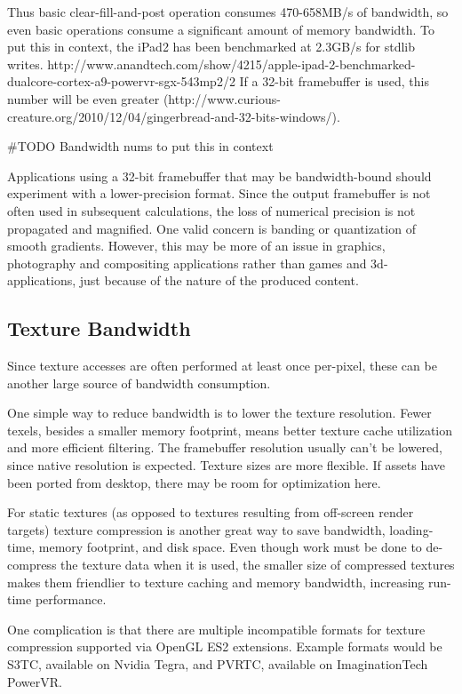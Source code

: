 Thus basic clear-fill-and-post operation consumes 470-658MB/s of bandwidth, so even basic operations consume a significant amount of memory bandwidth.  To put this in context, the iPad2 has been benchmarked at 2.3GB/s for stdlib writes.  http://www.anandtech.com/show/4215/apple-ipad-2-benchmarked-dualcore-cortex-a9-powervr-sgx-543mp2/2
If a 32-bit framebuffer is used, this number will be even greater (http://www.curious-creature.org/2010/12/04/gingerbread-and-32-bits-windows/).  

#TODO Bandwidth nums to put this in context

Applications using a 32-bit framebuffer that may be bandwidth-bound should experiment with a lower-precision format.  Since the output framebuffer is not often used in subsequent calculations, the loss of numerical precision is not propagated and magnified.  One valid concern is banding or quantization of smooth gradients.  However, this may be more of an issue in graphics, photography and compositing applications rather than games and 3d-applications, just because of the nature of the produced content.

\subsection{Texture Bandwidth}
Since texture accesses are often performed at least once per-pixel, these can be another large source of bandwidth consumption.

One simple way to reduce bandwidth is to lower the texture resolution.  Fewer texels, besides a smaller memory footprint, means better texture cache utilization and more efficient filtering.  The framebuffer resolution usually can't be lowered, since native resolution is expected.  Texture sizes are more flexible.  If assets have been ported from desktop, there may be room for optimization here.

For static textures (as opposed to textures resulting from off-screen render
targets) texture compression is another great way to save bandwidth,
loading-time, memory footprint, and disk space.  Even though work must be
done to de-compress the texture data when it is used, the smaller size of
compressed textures makes them friendlier to texture caching and memory
bandwidth, increasing run-time performance. 

One complication is that there are multiple incompatible formats for texture
compression supported via OpenGL ES2 extensions.  Example formats would be S3TC, available on Nvidia Tegra, and PVRTC, available on ImaginationTech PowerVR.

